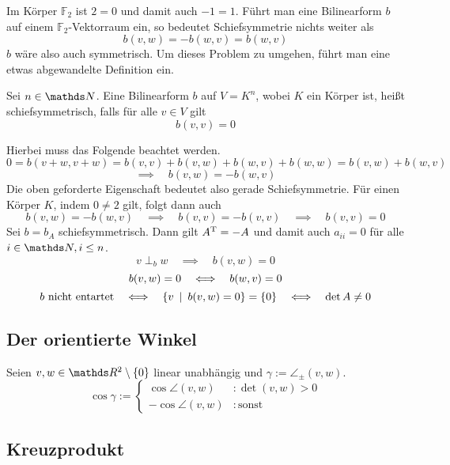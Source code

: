 			Im Körper $\mathds{F}_2$ ist $2=0$ und damit auch $-1=1$.
			Führt man eine Bilinearform $b$ auf einem $\mathds{F}_2$-Vektorraum ein, so bedeutet Schiefsymmetrie nichts weiter als
			\[ b(v,w) = -b(w,v) = b(w,v) \]
			$b$ wäre also auch symmetrisch.
			Um dieses Problem zu umgehen, führt man eine etwas abgewandelte Definition ein.

			\begin{definition}
				Sei $n\in\SN$.
				Eine Bilinearform $b$ auf $V=K^n$, wobei $K$ ein Körper ist, heißt schiefsymmetrisch, falls für alle $v\in V$ gilt
				\[ b(v,v) = 0 \]
			\end{definition}

			Hierbei muss das Folgende beachtet werden.
			\[ 0 = b(v+w,v+w) = b(v,v) + b(v,w) + b(w,v) + b(w,w) = b(v,w) + b(w,v) \]
			\[ \implies \quad b(v,w) = -b(w,v) \]
			Die oben geforderte Eigenschaft bedeutet also gerade Schiefsymmetrie.
			Für einen Körper $K$, indem $0\neq 2$ gilt, folgt dann auch
			\[ b(v,w) = -b(w,v) \quad \implies \quad b(v,v)=-b(v,v) \quad \implies \quad b(v,v) = 0 \]
			Sei $b = b_A$ schiefsymmetrisch.
			Dann gilt $A^\mathrm{T} = -A$ und damit auch $a_{ii}=0$ für alle $i\in\SN, i\leq n$.
			\[ v \perp_b w \quad \implies \quad b(v,w) = 0 \]
			\[ b(v,w) = 0 \quad \Longleftrightarrow \quad b(w,v) = 0 \]
			\[ b \text{ nicht entartet} \quad \Longleftrightarrow \quad \left\{ v \enspace \middle\vert \enspace b(v,w)=0 \right\} = \left\{ 0 \right\} \quad \Longleftrightarrow \quad \det A \neq 0 \]



	\subsection{Der orientierte Winkel} %
	\label{sub:der_orientierte_winkel}
	
		Seien $v,w\in\SR^2\setminus\curlb{0}$ linear unabhängig und $\gamma:=\angle_\pm(v,w)$.
		\[ \cos\gamma := \begin{cases} \cos\angle(v,w) & :\det(v,w)>0 \\ -\cos\angle(v,w) & :\mathrm{sonst} \end{cases} \]


	\subsection{Kreuzprodukt} %
	\label{sub:kreuzprodukt}
	
